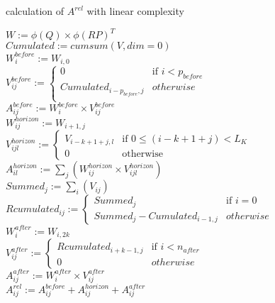 \begin{algorithm*}
	\caption{calculation of $A^{rel}$ with linear complexity}
	\label{alg:A_rel}
	$W := \phi(Q) \times \phi(RP)^T$\\
	$Cumulated := cumsum(V, dim=0)$\\
	$W^{before}_{i} := W_{i,0}$\\
	$V^{before}_{ij} := 
	\begin{cases}
		0 & \text{if }i < p_{before}\\
		Cumulated_{i-p_{before}, j} & otherwise\\
	\end{cases}$\\
	$A^{before}_{ij} := W^{before}_{i} \times V^{before}_{ij}$\\
	$W^{horizon}_{ij} := W_{i+1,j}$\\
	$V^{horizon}_{ijl} :=
	\begin{cases}
		V_{i-k+1+j, l} & \text{if }0 \leq (i-k+1+j) < L_K\\
		0 & \text{otherwise} 
	\end{cases}$\\
	$A^{horizon}_{il} := \sum_j \left( W^{horizon}_{ij} \times V^{horizon}_{ijl} \right)$\\
	$Summed_{j} := \sum_i \left( V_{ij}\right)$\\
	$Rcumulated_{ij} := 
	\begin{cases}
		Summed_{j} & \text{if }i=0\\
		Summed_{j} - Cumulated_{i-1,j} & otherwise
	\end{cases}$\\
	$W^{after}_{i} := W_{i, 2k}$\\
	$V^{after}_{ij} := 
	\begin{cases}
		Rcumulated_{i+k-1,j} & \text{if }i<n_{after}\\
		0 & otherwise
	\end{cases}$\\
	$A^{after}_{ij} := W^{after}_{i} \times V^{after}_{ij}$\\
	$A^{rel}_{ij} := A^{before}_{ij} + A^{horizon}_{ij} + A^{after}_{ij}$
\end{algorithm*}

\endinput